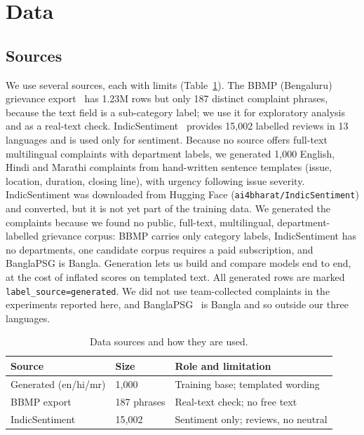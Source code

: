\documentclass[conference]{IEEEtran}
\begin{document}
\section{Data}
\subsection{Sources}
We use several sources, each with limits (Table~\ref{tab:data}). The BBMP (Bengaluru) grievance export~\cite{bbmp} has 1.23M rows but only 187 distinct
complaint phrases, because the text field is a sub-category label; we use it for exploratory analysis and as a real-text check.
IndicSentiment~\cite{doddapaneni2023towards} provides 15{,}002 labelled reviews in 13 languages and is used only for sentiment.
Because no source offers full-text multilingual complaints with department labels, we generated 1{,}000 English, Hindi and Marathi complaints
from hand-written sentence templates (issue, location, duration, closing line), with urgency following issue severity.
IndicSentiment was downloaded from Hugging Face (\texttt{ai4bharat/IndicSentiment}) and converted, but it is not yet part of the training data.
We generated the complaints because we found no public, full-text, multilingual, department-labelled grievance corpus: BBMP carries only category labels, IndicSentiment has no departments, one candidate corpus requires a paid subscription, and BanglaPSG is Bangla. Generation lets us build and compare models end to end, at the cost of inflated scores on templated text.
All generated rows are marked \texttt{label\_source=generated}. We did not use team-collected complaints in the experiments reported here, and BanglaPSG~\cite{banglapsg} is Bangla and so outside our three languages.

\begin{table}[t]
\caption{Data sources and how they are used.}
\label{tab:data}
\centering
\small
\begin{tabular}{@{}p{2.1cm}p{1.1cm}p{4.2cm}@{}}
\toprule
Source & Size & Role and limitation \\
\midrule
Generated (en/hi/mr) & 1{,}000 & Training base; templated wording \\
BBMP export & 187 phrases & Real-text check; no free text \\
IndicSentiment & 15{,}002 & Sentiment only; reviews, no neutral \\
\bottomrule
\end{tabular}
\end{table}
\end{document}
